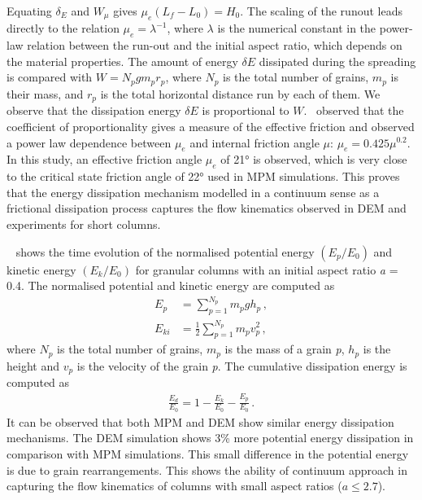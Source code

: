 Equating $\delta_E$ and $W_{\mu}$ gives $\mu_e (L_f - L_0) = H_0$. The scaling
of the runout leads directly to the relation $\mu_e = \lambda^{-1}$, where 
$\lambda$ is the numerical constant in the power-law relation between the 
run-out and the initial aspect ratio, which depends on the 
material properties. 
The amount of energy $\delta E$ dissipated 
during the spreading is compared with $W = N_p g m_p r_p$, where $N_p$ is the 
total number of grains, $m_p$ is their mass, and $r_p$ is the total horizontal 
distance run by each of them. We observe that the dissipation energy $\delta E$ 
is proportional to $W$.~\cite{Staron2007a} observed that the coefficient of 
proportionality gives a measure of the effective friction and 
observed a power law dependence between $\mu_e$ and internal friction angle 
$\mu$: $\mu_e=0.425\mu^{0.2}$. In this study, an effective friction angle 
$\mu_e$ of 21\si{\degree} is observed, which is very close to the critical 
state friction angle of 22\si{\degree} used in MPM simulations. This proves 
that the energy 
dissipation mechanism modelled in a continuum sense as a frictional dissipation 
process captures the flow kinematics observed in DEM and experiments for short 
columns.

~ shows the time evolution of the normalised potential 
energy $(E_{p}/E_0)$ and kinetic energy $(E_{k}/E_0)$ for granular columns with 
an initial aspect ratio \textit{a} = 0.4. The normalised potential and kinetic 
energy 
are computed as
%
\begin{align}
E_p & = \sum\limits_{p=1}^{N_p}{m_p g h_p} \,, \\
E_{ki} & = \frac{1}{2}\sum\limits_{p=1}^{N_p}{m_p v_p^2} \,,
\end{align}
%
where $N_p$ is the total number of grains, $m_p$ is 
the mass of a grain \textit{p}, $h_p$ is the height and 
$v_p$ is the velocity of the grain \textit{p}. The cumulative dissipation 
energy is computed as
%
\begin{align}
\frac{E_d}{E_0} = 1 - \frac{E_k}{E_0} - \frac{E_p}{E_0} \,.
\end{align}
%
It can be observed that both MPM and DEM show similar energy dissipation 
mechanisms. The DEM simulation shows 3\% more potential energy dissipation in 
comparison with MPM simulations. This small difference in the potential energy 
is due to grain rearrangements. This shows the ability of continuum approach in 
capturing the flow kinematics of columns with small aspect ratios ($a \le 
2.7$). 

